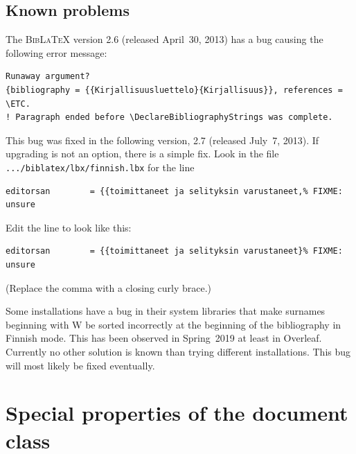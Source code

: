 \documentclass[utf8,english]{gradu3}
\begin{document}
\section{Known problems}

The \textsc{Bib\LaTeX} version 2.6 (released April~30, 2013) has a bug
causing the following error message:%
{\footnotesize%
\begin{verbatim}
Runaway argument?
{bibliography = {{Kirjallisuusluettelo}{Kirjallisuus}}, references = \ETC.
! Paragraph ended before \DeclareBibliographyStrings was complete.
\end{verbatim}
}%
This bug was fixed in the following version, 2.7 (released July~7,
2013).  If upgrading is not an option, there is a simple fix.  Look in
the file \texttt{.../biblatex/lbx/finnish.lbx} for the line
{\footnotesize%
\begin{verbatim}
editorsan        = {{toimittaneet ja selityksin varustaneet,% FIXME: unsure
\end{verbatim}
}%
Edit the line to look like this:
{\footnotesize%
\begin{verbatim}
editorsan        = {{toimittaneet ja selityksin varustaneet}% FIXME: unsure
\end{verbatim}
}%
(Replace the comma with a closing curly brace.)

Some installations have a bug in their system libraries that make
surnames beginning with W be sorted incorrectly at the beginning of
the bibliography in Finnish mode.  This has been observed in
Spring~2019 at least in Overleaf.  Currently no other solution is
known than trying different installations.  This bug will most likely
be fixed eventually.

\chapter{Special properties of the document class}
\end{document}
